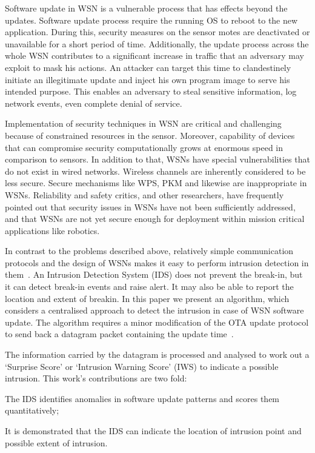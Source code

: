 \documentclass[conference,manuscript]{IEEEtran}
\begin{document}
Software update in WSN is a vulnerable process that has
effects beyond the updates. Software update process require
the running OS to reboot to the new application. During
this, security measures on the sensor motes are deactivated or
unavailable for a short period of time. Additionally, the update
process across the whole WSN contributes to a significant
increase in traffic that an adversary may exploit to mask his
actions. An attacker can target this time to clandestinely initiate
an illegitimate update and inject his own program image
to serve his intended purpose. This enables an adversary to
steal sensitive information, log network events, even complete
denial of service.

Implementation of security techniques in WSN are critical
and challenging because of constrained resources in the sensor.
Moreover, capability of devices that can compromise security
computationally grows at enormous speed in comparison to
sensors. In addition to that, WSNs have special vulnerabilities
that do not exist in wired networks. Wireless channels are
inherently considered to be less secure. Secure mechanisms
like WPS, PKM and likewise are inappropriate in WSNs.
Reliability and safety critics, and other researchers, have
frequently pointed out that security issues in WSNs have not
been sufficiently addressed, and that WSNs are not yet secure
enough for deployment within mission critical applications like
robotics.

In contrast to the problems described above, relatively
simple communication protocols and the design of WSNs
makes it easy to perform intrusion detection in them~\cite{quing09}.
An Intrusion Detection System (IDS) does not prevent the
break-in, but it can detect break-in events and raise alert. It
may also be able to report the location and extent of breakin. In this paper we present an algorithm, which considers a
centralised approach to detect the intrusion in case of WSN
software update. The algorithm requires a minor modification
of the OTA update protocol to send back a datagram packet
containing the update time~\cite{tep116}.

The information carried by the
datagram is processed and analysed to work out a `Surprise
Score' or `Intrusion Warning Score' (IWS) to indicate a
possible intrusion. 
This work's contributions are two fold: 
\begin{inparaenum}
\item  The IDS identifies anomalies in software update patterns
and scores them quantitatively;
\item It is demonstrated that the IDS
can indicate the location of intrusion point and possible extent
of intrusion.
\end{inparaenum}
\end{document}

